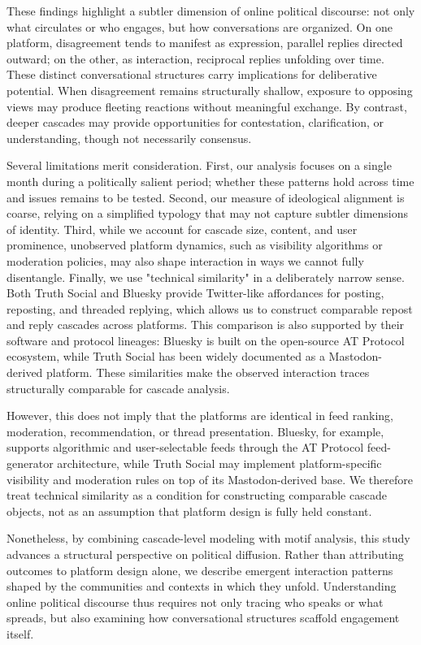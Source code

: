 \documentclass[letterpaper]{article} %
\begin{document}
These findings highlight a subtler dimension of online political discourse: not only what circulates or who engages, but how conversations are organized. On one platform, disagreement tends to manifest as expression, parallel replies directed outward; on the other, as interaction, reciprocal replies unfolding over time. These distinct conversational structures carry implications for deliberative potential. When disagreement remains structurally shallow, exposure to opposing views may produce fleeting reactions without meaningful exchange. By contrast, deeper cascades may provide opportunities for contestation, clarification, or understanding, though not necessarily consensus.

Several limitations merit consideration. First, our analysis focuses on a single month during a politically salient period; whether these patterns hold across time and issues remains to be tested. Second, our measure of ideological alignment is coarse, relying on a simplified typology that may not capture subtler dimensions of identity. Third, while we account for cascade size, content, and user prominence, unobserved platform dynamics, such as visibility algorithms or moderation policies, may also shape interaction in ways we cannot fully disentangle. Finally, we use "technical similarity" in a deliberately narrow sense. Both Truth Social and Bluesky provide Twitter-like affordances for posting, reposting, and threaded replying, which allows us to construct comparable repost and reply cascades across platforms. This comparison is also supported by their software and protocol lineages: Bluesky is built on the open-source AT Protocol ecosystem, while Truth Social has been widely documented as a Mastodon-derived platform. These similarities make the observed interaction traces structurally comparable for cascade analysis.

However, this does not imply that the platforms are identical in feed ranking, moderation, recommendation, or thread presentation. Bluesky, for example, supports algorithmic and user-selectable feeds through the AT Protocol feed-generator architecture, while Truth Social may implement platform-specific visibility and moderation rules on top of its Mastodon-derived base. We therefore treat technical similarity as a condition for constructing comparable cascade objects, not as an assumption that platform design is fully held constant.

Nonetheless, by combining cascade-level modeling with motif analysis, this study advances a structural perspective on political diffusion. Rather than attributing outcomes to platform design alone, we describe emergent interaction patterns shaped by the communities and contexts in which they unfold. Understanding online political discourse thus requires not only tracing who speaks or what spreads, but also examining how conversational structures scaffold engagement itself.
\end{document}
